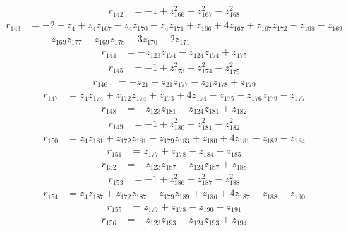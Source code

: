 \begin{align*}
r_{142} &=-1+z_{166}^{2}+z_{167}^{2}-z_{168}^{2}
\end{align*}
\begin{align*}
r_{143} &=-2-z_{4}+z_{4}z_{167}-z_{4}z_{170}-z_{4}z_{171}+z_{166}+4z_{167}+z_{167}z_{172}-z_{168}-z_{169}\\
&\quad -z_{169}z_{177}-z_{169}z_{178}-3z_{170}-2z_{171}
\end{align*}
\begin{align*}
r_{144} &=-z_{123}z_{174}-z_{124}z_{174}+z_{175}
\end{align*}
\begin{align*}
r_{145} &=-1+z_{173}^{2}+z_{174}^{2}-z_{175}^{2}
\end{align*}
\begin{align*}
r_{146} &=-z_{21}-z_{21}z_{177}-z_{21}z_{178}+z_{179}
\end{align*}
\begin{align*}
r_{147} &=z_{4}z_{174}+z_{172}z_{174}+z_{173}+4z_{174}-z_{175}-z_{176}z_{179}-z_{177}
\end{align*}
\begin{align*}
r_{148} &=-z_{123}z_{181}-z_{124}z_{181}+z_{182}
\end{align*}
\begin{align*}
r_{149} &=-1+z_{180}^{2}+z_{181}^{2}-z_{182}^{2}
\end{align*}
\begin{align*}
r_{150} &=z_{4}z_{181}+z_{172}z_{181}-z_{179}z_{183}+z_{180}+4z_{181}-z_{182}-z_{184}
\end{align*}
\begin{align*}
r_{151} &=z_{177}+z_{178}-z_{184}-z_{185}
\end{align*}
\begin{align*}
r_{152} &=-z_{123}z_{187}-z_{124}z_{187}+z_{188}
\end{align*}
\begin{align*}
r_{153} &=-1+z_{186}^{2}+z_{187}^{2}-z_{188}^{2}
\end{align*}
\begin{align*}
r_{154} &=z_{4}z_{187}+z_{172}z_{187}-z_{179}z_{189}+z_{186}+4z_{187}-z_{188}-z_{190}
\end{align*}
\begin{align*}
r_{155} &=z_{177}+z_{178}-z_{190}-z_{191}
\end{align*}
\begin{align*}
r_{156} &=-z_{123}z_{193}-z_{124}z_{193}+z_{194}
\end{align*}
